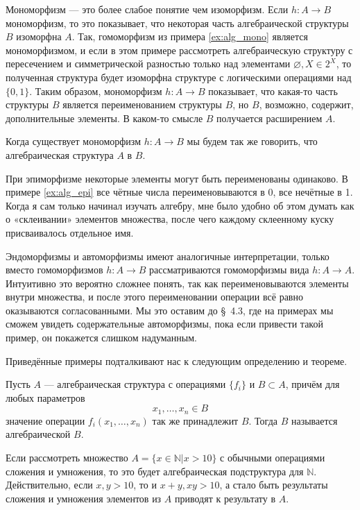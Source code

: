 Мономорфизм — это более слабое понятие чем изоморфизм. Если $h:A\to B$ мономорфизм, то это показывает, что некоторая часть алгебраической структуры $B$ изоморфна $A$. Так, гомоморфизм из примера \ref{ex:alg_mono} является мономорфизмом, и если в этом примере рассмотреть алгебраическую структуру с пересечением и симметрической разностью только над элементами $\varnothing, X \in 2^X$, то полученная структура будет изоморфна структуре с логическими операциями над $\{0, 1\}$. Таким образом, мономорфизм $h:A\to B$ показывает, что какая-то часть структуры $B$ является переименованием структуры $B$, но $B$, возможно, содержит, дополнительные элементы. В каком-то смысле $B$ получается расширением $A$.

Когда существует мономорфизм $h:A\to B$ мы будем так же говорить, что алгебраическая структура $A$  в $B$.

При эпиморфизме некоторые элементы могут быть переименованы одинаково. В примере \ref{ex:alg_epi} все чётные числа переименовываются в 0, все нечётные в 1. Когда я сам только начинал изучать алгебру, мне было удобно об этом думать как о «склеивании» элементов множества, после чего каждому склеенному куску присваивалось отдельное имя.

Эндоморфизмы и автоморфизмы имеют аналогичные интерпретации, только вместо гомоморфизмов $h:A\to B$ рассматриваются гомоморфизмы вида $h:A\to A$. Интуитивно это вероятно сложнее понять, так как переименовываются элементы внутри множества, и после этого переименовании операции всё равно оказываются согласованными. Мы это оставим до \S~4.3, где на примерах мы сможем увидеть содержательные автоморфизмы, пока если привести такой пример, он покажется слишком надуманным.

Приведённые примеры подталкивают нас к следующим определению и теореме.

\begin{definition}
	Пусть $A$ — алгебраическая структура с операциями $\{f_i\}$ и $B\subset A$, причём для любых параметров $$x_1,\ldots,x_n \in B$$ значение операции $f_i(x_1,\ldots,x_n)$ так же принадлежит $B$. Тогда $B$ называется алгебраической  $B$.
\end{definition}

\begin{example}
	Если рассмотреть множество $A = \{x\in \mathbb{N}|x>10\}$ с обычными операциями сложения и умножения, то это будет алгебраическая подструктура для $\mathbb{N}$. Действительно, если ${x,y>10}$, то и $x+y, xy>10$, а стало быть результаты сложения и умножения элементов из $A$ приводят к результату в $A$.
\end{example}

